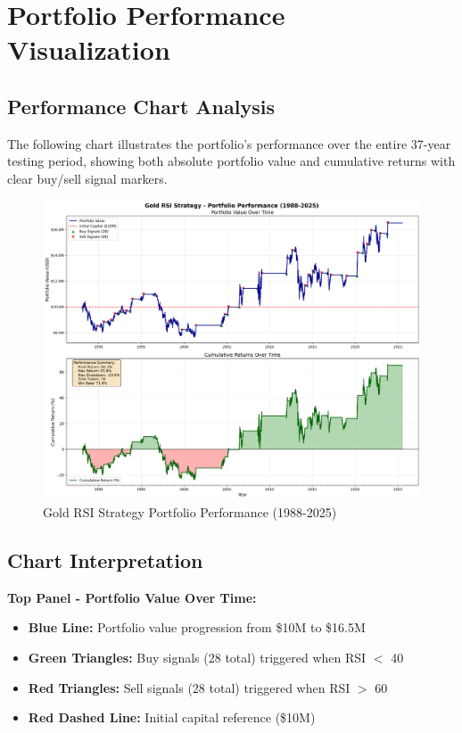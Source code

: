 \documentclass[11pt,a4paper]{article}
\begin{document}
\newpage

\section{Portfolio Performance Visualization}

\subsection{Performance Chart Analysis}

The following chart illustrates the portfolio's performance over the entire 37-year testing period, showing both absolute portfolio value and cumulative returns with clear buy/sell signal markers.

\begin{figure}[H]
\centering
\includegraphics[width=\textwidth]{RSI_Portfolio_Performance.png}
\caption{Gold RSI Strategy Portfolio Performance (1988-2025)}
\label{fig:portfolio_performance}
\end{figure}

\subsection{Chart Interpretation}

\textbf{Top Panel - Portfolio Value Over Time:}
\begin{itemize}
    \item \textbf{Blue Line:} Portfolio value progression from \$10M to \$16.5M
    \item \textbf{Green Triangles:} Buy signals (28 total) triggered when RSI $<$ 40
    \item \textbf{Red Triangles:} Sell signals (28 total) triggered when RSI $>$ 60
    \item \textbf{Red Dashed Line:} Initial capital reference (\$10M)
\end{itemize}
\end{document}
